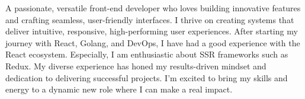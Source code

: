 A passionate, versatile front-end developer who loves building innovative features and crafting seamless, user-friendly interfaces. 
I thrive on creating systems that deliver intuitive, responsive, high-performing user experiences. 
After starting my journey with React, Golang, and DevOps, I have had a good experience with the React ecosystem. Especially, I am enthusiastic about SSR frameworks such as Redux. 
My diverse experience has honed my results-driven mindset and dedication to delivering successful projects. 
I'm excited to bring my skills and energy to a dynamic new role where I can make a real impact.